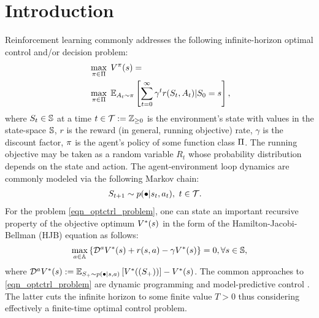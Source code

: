 \documentclass[12pt,twoside]{../../mitthesis}
\begin{document}
\section{Introduction}
Reinforcement learning commonly addresses the following infinite-horizon optimal control and/or decision problem:
\begin{equation}
    \label{eqn_optctrl_problem}
    \begin{aligned}
    & \, \max_{\policy \in \policies} \; \Value^\policy (\state) = \\
    & \, \max_{\policy \in \policies} \; \E[\Action_t \sim \policy]{\sum\limits_{t=0}^{\infty} \gamma^t r(\State_t, \Action_t) \vert \State_0=\state},
    \end{aligned}
\end{equation}
where $\State_t \in \states$ at a time $t \in \T := \Z_{\ge0}$ is the environment's state with values in the state-space $\states$, $r$ is the reward (in general, running objective) rate, $\gamma$ is the discount factor, $\policy$ is the agent's policy of some function class $\policies$.
The running objective may be taken as a random variable $R_t$ whose probability distribution depends on the state and action.
The agent-environment loop dynamics are commonly modeled via the following Markov chain:
\begin{equation}
    \label{eqn_sysmarkov}
    \begin{aligned}
        & \State_{t+1} \sim \transit(\bullet \vert \state_t, \action_t), \spc t \in \T.
    \end{aligned}
\end{equation}
For the problem \eqref{eqn_optctrl_problem}, one can state an important recursive property of the objective optimum $\Value^*(\state)$ in the form of the Hamilton-Jacobi-Bellman (HJB) equation as follows:
\begin{equation}
    \label{eqn_hjb}
    \max_{\action \in \actions}{\{ \mathcal D^\action \Value^*(\state) + r(\state, \action) - \gamma \Value^*(\state)\}} = 0, \forall \state \in \states,
\end{equation}
where $\mathcal D^\action \Value^*(\state) := \E[S_+ \sim \transit(\bullet \vert \state, \action)]{\Value^*((\State_{+}))} - \Value^*(\state)$.
The common approaches to \eqref{eqn_optctrl_problem} are dynamic programming \cite{Bertsekas2019Reinforcementl,Lewis2009Reinforcementl} and model-predictive control \cite{Garcia1989Modelpredictiv,Borrelli2011PredictiveCont,Darby2012MPCCurrentpra,Mayne2014Modelpredictiv}.
The latter cuts the infinite horizon to some finite value $T>0$ thus considering effectively a finite-time optimal control problem.
\end{document}
